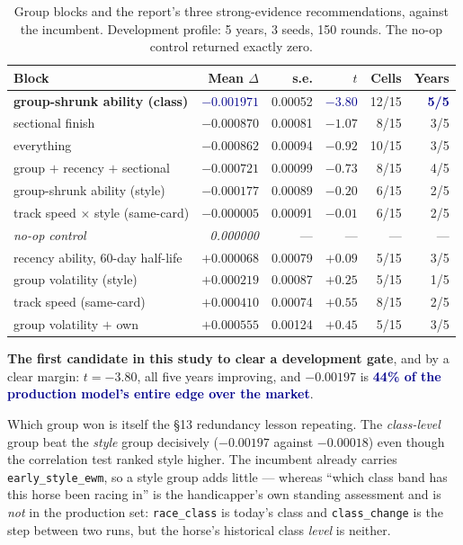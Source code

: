 \documentclass[11pt,a4paper]{article}
\newcommand{\good}[1]{\textcolor{darkblue}{\textbf{#1}}}
\begin{document}
\begin{table}[htbp]\centering\small
\caption{Group blocks and the report's three strong-evidence recommendations,
against the incumbent. Development profile: 5 years, 3 seeds, 150 rounds. The
no-op control returned exactly zero.}
\begin{tabular}{lrrrrr}
\toprule
Block & Mean $\Delta$ & s.e. & $t$ & Cells & Years\\
\midrule
\textbf{group-shrunk ability (class)} & \good{$-0.001971$} & 0.00052 & \good{$-3.80$} & 12/15 & \good{5/5}\\
sectional finish & $-0.000870$ & 0.00081 & $-1.07$ & 8/15 & 3/5\\
everything & $-0.000862$ & 0.00094 & $-0.92$ & 10/15 & 3/5\\
group $+$ recency $+$ sectional & $-0.000721$ & 0.00099 & $-0.73$ & 8/15 & 4/5\\
group-shrunk ability (style) & $-0.000177$ & 0.00089 & $-0.20$ & 6/15 & 2/5\\
track speed $\times$ style (same-card) & $-0.000005$ & 0.00091 & $-0.01$ & 6/15 & 2/5\\
\rowcolor{shade}\emph{no-op control} & \emph{0.000000} & --- & --- & --- & ---\\
recency ability, 60-day half-life & $+0.000068$ & 0.00079 & $+0.09$ & 5/15 & 3/5\\
group volatility (style) & $+0.000219$ & 0.00087 & $+0.25$ & 5/15 & 1/5\\
track speed (same-card) & $+0.000410$ & 0.00074 & $+0.55$ & 8/15 & 2/5\\
group volatility $+$ own & $+0.000555$ & 0.00124 & $+0.45$ & 5/15 & 3/5\\
\bottomrule
\end{tabular}
\end{table}

\textbf{The first candidate in this study to clear a development gate}, and by a
clear margin: $t=-3.80$, all five years improving, and $-0.00197$ is \good{44\% of
the production model's entire edge over the market}.

Which group won is itself the \S13 redundancy lesson repeating. The
\emph{class-level} group beat the \emph{style} group decisively ($-0.00197$ against
$-0.00018$) even though the correlation test ranked style higher. The incumbent
already carries \texttt{early\_style\_ewm}, so a style group adds little --- whereas
``which class band has this horse been racing in'' is the handicapper's own
standing assessment and is \emph{not} in the production set: \texttt{race\_class} is
today's class and \texttt{class\_change} is the step between two runs, but the
horse's historical class \emph{level} is neither.
\end{document}
